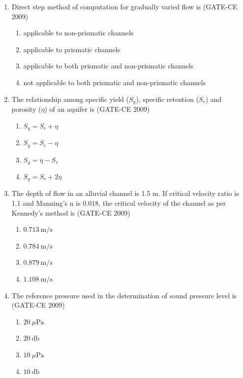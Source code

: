 \documentclass[12pt]{article}
\begin{document}
\begin{enumerate}[label=Q.\arabic*]
    \item Direct step method of computation for gradually varied flow is (GATE-CE 2009)
    \begin{enumerate}[label=(\Alph*)]
        \item applicable to non-prismatic channels
        \item applicable to prismatic channels
        \item applicable to both prismatic and non-prismatic channels
        \item not applicable to both prismatic and non-prismatic channels
    \end{enumerate}
    
    \item The relationship among specific yield ($S_y$), specific retention ($S_r$) and porosity ($\eta$) of an aquifer is (GATE-CE 2009)
    \begin{enumerate}[label=(\Alph*)]
        \item $S_y = S_r + \eta$ 
         \item $S_y = S_r - \eta$ 
        \item $S_y = \eta - S_r$ 
        \item $S_y = S_r + 2\eta$
    \end{enumerate}
    
    \item The depth of flow in an alluvial channel is 1.5 m. If critical velocity ratio is 1.1 and Manning's n is 0.018, the critical velocity of the channel as per Kennedy's method is (GATE-CE 2009)
    \begin{enumerate}[label=(\Alph*)]
        \item $0.713~\mathrm{m/s}$
        \item $0.784~\mathrm{m/s}$
        \item $0.879~\mathrm{m/s}$
        \item $1.108~\mathrm{m/s}$
    \end{enumerate}
    
    \item The reference pressure used in the determination of sound pressure level is (GATE-CE 2009)
    \begin{enumerate}[label=(\Alph*)]
        \item $20~\mu\mathrm{Pa}$
        \item $20~\mathrm{db}$
        \item $10~\mu\mathrm{Pa}$
        \item $10~\mathrm{db}$
    \end{enumerate}
    

\end{enumerate}
\end{document}
